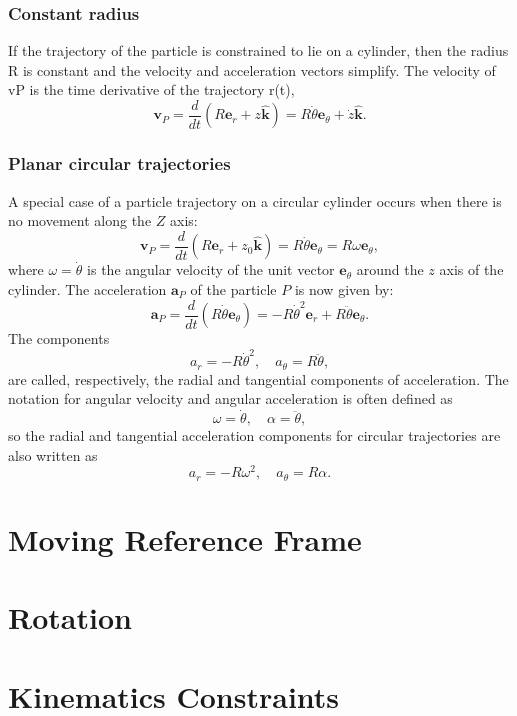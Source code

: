 \subsubsection{Constant radius}
If the trajectory of the particle is constrained to lie on a cylinder, then the radius R is constant and the velocity and acceleration vectors simplify. The velocity of vP is the time derivative of the trajectory r(t),
\[
\mathbf{v}_P = \frac{d}{dt}\left(R\mathbf{e}_r + z\hat{\mathbf{k}}\right) = R\dot{\theta}\mathbf{e}_\theta + \dot{z}\hat{\mathbf{k}}.
\]
\subsubsection{Planar circular trajectories}
A special case of a particle trajectory on a circular cylinder occurs when there is no movement along the $Z$ axis:
\[
\mathbf{v}_P = \frac{d}{dt}\left(R\mathbf{e}_r + z_0\hat{\mathbf{k}}\right) = R\dot{\theta}\mathbf{e}_\theta = R\omega\mathbf{e}_\theta,
\]
where $\omega = \dot{\theta}$ is the angular velocity of the unit vector $\mathbf{e}_\theta$ around the $z$ axis of the cylinder.
The acceleration $\mathbf{a}_P$ of the particle $P$ is now given by:
\[
\mathbf{a}_P = \frac{d}{dt}\left(R\dot{\theta}\mathbf{e}_\theta \right) = -R\dot{\theta }^2\mathbf{e}_r + R\ddot{\theta}\mathbf{e}_\theta .
\]
The components
\[
a_r = -R\dot{\theta}^2,\quad a_\theta = R\ddot{\theta},
\]
are called, respectively, the radial and tangential components of acceleration.
The notation for angular velocity and angular acceleration is often defined as
\[
\omega = \dot{\theta },\quad \alpha = \ddot{\theta},
\]
so the radial and tangential acceleration components for circular trajectories are also written as
\[
a_r = -R\omega^2,\quad a_\theta = R\alpha .
\]


\section{Moving Reference Frame}
\section{Rotation}
\section{Kinematics Constraints}
